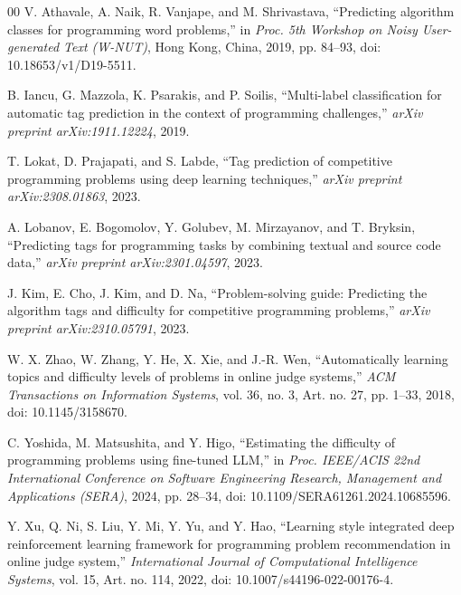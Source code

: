 \documentclass[conference]{IEEEtran}
\begin{document}
\begin{thebibliography}{00}
V. Athavale, A. Naik, R. Vanjape, and M. Shrivastava,
``Predicting algorithm classes for programming word problems,''
in \emph{Proc. 5th Workshop on Noisy User-generated Text (W-NUT)},
Hong Kong, China, 2019, pp. 84--93,
doi: 10.18653/v1/D19-5511.

B. Iancu, G. Mazzola, K. Psarakis, and P. Soilis,
``Multi-label classification for automatic tag prediction in the context of
programming challenges,''
\emph{arXiv preprint arXiv:1911.12224}, 2019.

T. Lokat, D. Prajapati, and S. Labde,
``Tag prediction of competitive programming problems using deep learning
techniques,''
\emph{arXiv preprint arXiv:2308.01863}, 2023.

A. Lobanov, E. Bogomolov, Y. Golubev, M. Mirzayanov, and T. Bryksin,
``Predicting tags for programming tasks by combining textual and source code
data,''
\emph{arXiv preprint arXiv:2301.04597}, 2023.

J. Kim, E. Cho, J. Kim, and D. Na,
``Problem-solving guide: Predicting the algorithm tags and difficulty for
competitive programming problems,''
\emph{arXiv preprint arXiv:2310.05791}, 2023.

W. X. Zhao, W. Zhang, Y. He, X. Xie, and J.-R. Wen,
``Automatically learning topics and difficulty levels of problems in online
judge systems,''
\emph{ACM Transactions on Information Systems}, vol. 36, no. 3,
Art. no. 27, pp. 1--33, 2018,
doi: 10.1145/3158670.

C. Yoshida, M. Matsushita, and Y. Higo,
``Estimating the difficulty of programming problems using fine-tuned LLM,''
in \emph{Proc. IEEE/ACIS 22nd International Conference on Software
Engineering Research, Management and Applications (SERA)}, 2024,
pp. 28--34,
doi: 10.1109/SERA61261.2024.10685596.

Y. Xu, Q. Ni, S. Liu, Y. Mi, Y. Yu, and Y. Hao,
``Learning style integrated deep reinforcement learning framework for
programming problem recommendation in online judge system,''
\emph{International Journal of Computational Intelligence Systems},
vol. 15, Art. no. 114, 2022,
doi: 10.1007/s44196-022-00176-4.

\end{thebibliography}
\end{document}
